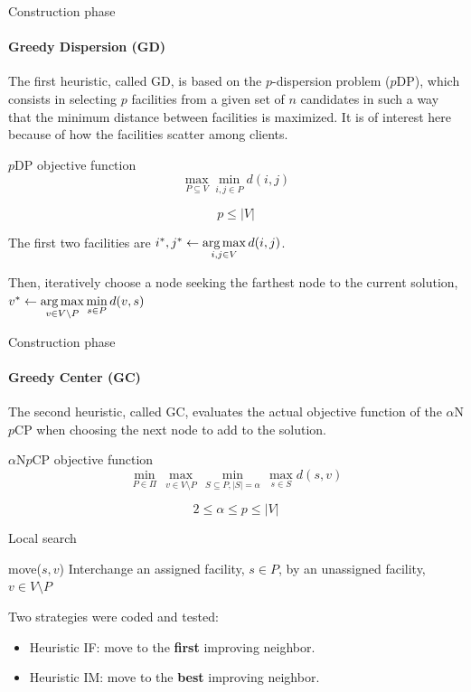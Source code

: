 \documentclass{beamer}
\newcommand{\argmax}{\mathop{\mathrm{arg\,max}}\limits}
\newcommand{\anpcp}{$\alpha$N$p$CP\xspace}
\newcommand{\pdp}{$p$DP\xspace}
\begin{document}
\begin{frame}{Construction phase}
    \framesubtitle{Greedy Dispersion (GD)}
    The first heuristic, called GD, is based on the $p$-dispersion problem (\pdp), which consists in selecting $p$ facilities from a given set of $n$ candidates in such a way that the minimum distance between facilities is maximized. It is of interest here because of how the facilities scatter among clients.
    
    \begin{block}{\pdp objective function}
        $$
        \max\limits_{P \subseteq V} \min\limits_{i,j \in P} d(i, j)
        $$
        
        $$p \leq |V|$$
    \end{block}
    
    The first two facilities are $i^*,j^* \gets \argmax\limits_{i,j \in V} d(i,j)$.
    
    Then, iteratively choose a node seeking the farthest node to the current solution, $v^* \gets \argmax\limits_{v \in V \setminus P} \min\limits_{s \in P} d(v, s)$
\end{frame}

\begin{frame}{Construction phase}
    \framesubtitle{Greedy Center (GC)}
    
    The second heuristic, called GC, evaluates the actual objective function of the \anpcp when choosing the next node to add to the solution.
    
    \begin{block}{\anpcp objective function}
        $$
        \min\limits_{P \in \Pi} \,
        \max\limits_{v \in V \setminus P} \,
        \min\limits_{S \subseteq P, |S| = \alpha} \,
        \max\limits_{s \in S}{d(s, v)}
        $$
        
        $$2 \leq \alpha \leq p \leq |V|$$
    \end{block}
\end{frame}

\begin{frame}{Local search}
    \begin{block}{move($s, v$)}
        \centering
        Interchange an assigned facility, $s \in P$, by an unassigned facility, $v \in V \setminus P$
    \end{block}
    
    Two strategies were coded and tested:
    \begin{itemize}
        \item Heuristic IF: move to the \textbf{first} improving neighbor.
        \item Heuristic IM: move to the \textbf{best} improving neighbor.
    \end{itemize}
\end{frame}
\end{document}
